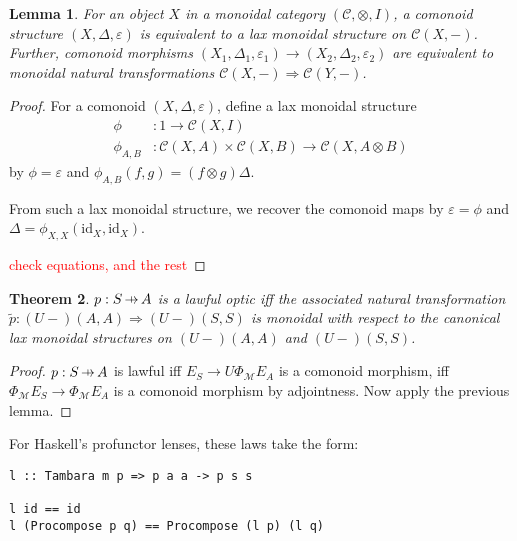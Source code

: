 \documentclass[11pt,letterpaper]{article}
\theoremstyle{plain}
\newtheorem{theorem}{Theorem}[subsection]
\newtheorem{lemma}[theorem]{Lemma}
\theoremstyle{definition}
\newcommand{\C}{\mathscr{C}}
\newcommand{\M}{\mathscr{M}}
\newcommand{\id}{\mathrm{id}}
\newcommand{\hto}{\ensuremath{\,\mathaccent\shortmid\rightarrow\,}}
\newcommand{\todo}[1]{\textcolor{red}{\small #1}}
\begin{document}
\begin{lemma}
  For an object $X$ in a monoidal category $(\C, \otimes, I)$, a comonoid structure $(X,\Delta,\varepsilon)$ is equivalent to a lax monoidal structure on $\C(X, -)$. Further, comonoid morphisms $(X_1,\Delta_1,\varepsilon_1) \to (X_2,\Delta_2,\varepsilon_2)$ are equivalent to monoidal natural transformations $\C(X, -) \Rightarrow \C(Y, -)$.
\end{lemma}
\begin{proof}
  For a comonoid $(X,\Delta,\varepsilon)$, define a lax monoidal structure
  \begin{align*}
    \phi &: 1 \to \C(X, I) \\
    \phi_{A, B} &: \C(X, A) \times \C(X, B) \to \C(X, A \otimes B)
  \end{align*}
  by $\phi = \varepsilon$ and $\phi_{A, B}(f, g) = (f \otimes g) \Delta$.

  From such a lax monoidal structure, we recover the comonoid maps by $\varepsilon = \phi$ and $\Delta = \phi_{X, X}(\id_X, \id_X)$.

  \todo{check equations, and the rest}
\end{proof}

\begin{theorem}
  $p : S \hto A$ is a lawful optic iff the associated natural transformation $\tilde{p} : (U-)(A,A) \Rightarrow (U-)(S,S)$ is monoidal with respect to the canonical lax monoidal structures on $(U-)(A,A)$ and $(U-)(S,S)$.
\end{theorem}
\begin{proof}
  $p : S \hto A$ is lawful iff $E_S \rightarrow U \Phi_\M E_A$ is a comonoid morphism, iff $\Phi_\M E_S \rightarrow \Phi_\M E_A$ is a comonoid morphism by adjointness. Now apply the previous lemma.
\end{proof}

  For Haskell's profunctor lenses, these laws take the form:
\begin{verbatim}
l :: Tambara m p => p a a -> p s s

l id == id
l (Procompose p q) == Procompose (l p) (l q)
\end{verbatim}
\end{document}
